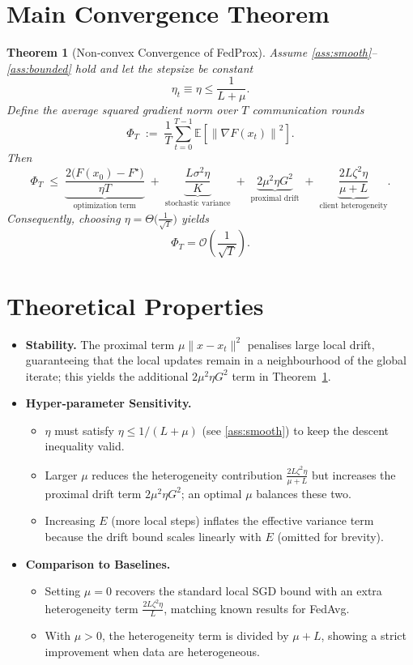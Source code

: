 \documentclass{article}
\newtheorem{theorem}{Theorem}
\newcommand{\E}{\mathbb{E}}
\newcommand{\norm}[1]{\left\|#1\right\|}
\begin{document}
\section*{Main Convergence Theorem}
\begin{theorem}[Non‑convex Convergence of FedProx]\label{thm:main}
Assume \ref{ass:smooth}–\ref{ass:bounded} hold and let the stepsize be constant
\[
\eta_t\equiv\eta\le\frac{1}{L+\mu}.
\]
Define the average squared gradient norm over $T$ communication rounds
\[
\Phi_T\;:=\;\frac1T\sum_{t=0}^{T-1}\E\!\left[\norm{\nabla F(x_t)}^2\right].
\]
Then
\[
\Phi_T
\;\le\;
\underbrace{\frac{2\big(F(x_0)-F^\star\big)}{\eta T}}_{\text{optimization term}}
\;+\;
\underbrace{\frac{L\sigma^2\eta}{K}}_{\text{stochastic variance}}
\;+\;
\underbrace{2\mu^2\eta G^2}_{\text{proximal drift}}
\;+\;
\underbrace{ \frac{2L\zeta^2\eta}{\mu+L}}_{\text{client heterogeneity}} .
\]
Consequently, choosing $\eta=\Theta\big(\frac{1}{\sqrt{T}}\big)$ yields
\[
\Phi_T = \mathcal{O}\!\left(\frac{1}{\sqrt{T}}\right).
\]
\end{theorem}

\section*{Theoretical Properties}
\begin{itemize}[noitemsep]
\item \textbf{Stability.} The proximal term $\mu\|x-x_t\|^2$ penalises large local drift, guaranteeing that the local updates remain in a neighbourhood of the global iterate; this yields the additional $2\mu^2\eta G^2$ term in Theorem~\ref{thm:main}.
\item \textbf{Hyper‑parameter Sensitivity.}
    \begin{itemize}
    \item $\eta$ must satisfy $\eta\le1/(L+\mu)$ (see \ref{ass:smooth}) to keep the descent inequality valid.
    \item Larger $\mu$ reduces the heterogeneity contribution $\frac{2L\zeta^2\eta}{\mu+L}$ but increases the proximal drift term $2\mu^2\eta G^2$; an optimal $\mu$ balances these two.
    \item Increasing $E$ (more local steps) inflates the effective variance term because the drift bound scales linearly with $E$ (omitted for brevity).
    \end{itemize}
\item \textbf{Comparison to Baselines.}
    \begin{itemize}
    \item Setting $\mu=0$ recovers the standard local SGD bound with an extra heterogeneity term $\frac{2L\zeta^2\eta}{L}$, matching known results for FedAvg.
    \item With $\mu>0$, the heterogeneity term is divided by $\mu+L$, showing a strict improvement when data are heterogeneous.
    \end{itemize}
\end{itemize}
\end{document}
